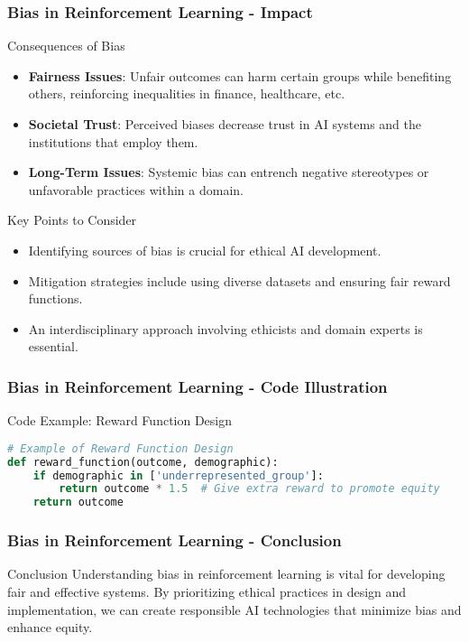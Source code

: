 \documentclass{beamer}
\begin{document}
\begin{frame}[fragile]
    \frametitle{Bias in Reinforcement Learning - Impact}
    \begin{block}{Consequences of Bias}
        \begin{itemize}
            \item \textbf{Fairness Issues}: Unfair outcomes can harm certain groups while benefiting others, reinforcing inequalities in finance, healthcare, etc.
            \item \textbf{Societal Trust}: Perceived biases decrease trust in AI systems and the institutions that employ them.
            \item \textbf{Long-Term Issues}: Systemic bias can entrench negative stereotypes or unfavorable practices within a domain.
        \end{itemize}
    \end{block}

    \begin{block}{Key Points to Consider}
        \begin{itemize}
            \item Identifying sources of bias is crucial for ethical AI development.
            \item Mitigation strategies include using diverse datasets and ensuring fair reward functions.
            \item An interdisciplinary approach involving ethicists and domain experts is essential.
        \end{itemize}
    \end{block}
\end{frame}

\begin{frame}[fragile]
    \frametitle{Bias in Reinforcement Learning - Code Illustration}
    \begin{block}{Code Example: Reward Function Design}
        \begin{lstlisting}[language=Python]
# Example of Reward Function Design
def reward_function(outcome, demographic):
    if demographic in ['underrepresented_group']:
        return outcome * 1.5  # Give extra reward to promote equity
    return outcome
        \end{lstlisting}
    \end{block}
\end{frame}

\begin{frame}[fragile]
    \frametitle{Bias in Reinforcement Learning - Conclusion}
    \begin{block}{Conclusion}
        Understanding bias in reinforcement learning is vital for developing fair and effective systems. 
        By prioritizing ethical practices in design and implementation, we can create responsible AI technologies that minimize bias and enhance equity.
    \end{block}
\end{frame}
\end{document}
